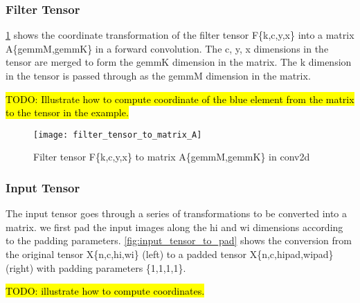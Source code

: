 \subsubsection{Filter Tensor}
\Fig \ref{fig:filter_tensor_to_matrix_A} shows the coordinate transformation of
the filter tensor F\{k,c,y,x\} into a matrix A\{gemmM,gemmK\} in a forward convolution.
The c, y, x dimensions in the tensor are merged to form the gemmK dimension in the
matrix.
The k dimension in the tensor is passed through as the gemmM dimension in the matrix.

\hl{TODO: Illustrate how to compute coordinate of the blue element from the matrix
to the tensor in the example.}

{}
\begin{figure}[!h]
  \centering
  \texttt{[image: filter\_tensor\_to\_matrix\_A]}


  \caption{Filter tensor F\{k,c,y,x\} to matrix A\{gemmM,gemmK\} in conv2d}
  \label{fig:filter_tensor_to_matrix_A}
\end{figure}


\subsubsection{Input Tensor}
The input tensor goes through a series of transformations to be converted into a matrix.
we first pad the input images along the hi and wi dimensions according to the
padding parameters.
\Fig \ref{fig:input_tensor_to_pad} shows the conversion from the original tensor
X\{n,c,hi,wi\} (left) to a padded tensor X\{n,c,hipad,wipad\} (right) with padding
parameters \{1,1,1,1\}.

\hl{TODO: illustrate how to compute coordinates.}

